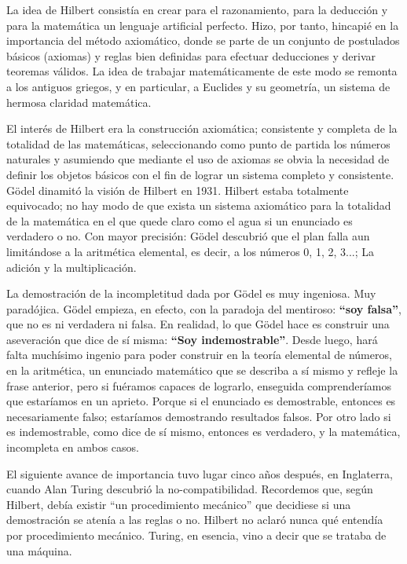 \documentclass{article}
\begin{document}
La idea de Hilbert consistía en crear para el razonamiento, para la deducción y para la matemática un lenguaje artificial perfecto. Hizo, por tanto, hincapié en la importancia del método axiomático, donde se parte de un conjunto de postulados básicos (axiomas) y reglas bien definidas para efectuar deducciones y derivar teoremas válidos. La idea de trabajar matemáticamente de este modo se remonta a los antiguos griegos, y en particular, a Euclides y su geometría, un sistema de hermosa claridad matemática.

El interés de Hilbert era la construcción axiomática; consistente y completa de la totalidad de las matemáticas, seleccionando como punto de partida los números naturales y asumiendo que mediante el uso de axiomas se obvia la necesidad de definir los objetos básicos con el fin de lograr un sistema completo y consistente. 
Gödel dinamitó la visión de Hilbert en 1931. Hilbert estaba totalmente equivocado; no hay modo de que exista un sistema axiomático para la totalidad de la matemática en el que quede claro como el agua si un enunciado es verdadero o no. Con mayor precisión: Gödel descubrió que el plan falla aun limitándose a la aritmética elemental, es decir, a los números 0, 1, 2, 3...; La adición y la multiplicación. 

La demostración de la incompletitud dada por Gödel es muy ingeniosa. Muy paradójica. Gödel empieza, en efecto, con la paradoja del mentiroso: \textbf{“soy falsa”}, que no es ni verdadera ni falsa. En realidad, lo que Gödel hace es construir una aseveración que dice de sí misma: \textbf{“Soy indemostrable”}. Desde luego, hará falta muchísimo ingenio para poder construir en la teoría elemental de números, en la aritmética, un enunciado matemático que se describa a sí mismo y refleje la frase anterior, pero si fuéramos capaces de lograrlo, enseguida comprenderíamos que estaríamos en un aprieto. Porque si el enunciado es demostrable, entonces es necesariamente falso; estaríamos demostrando resultados falsos. Por otro lado si es indemostrable, como dice de sí mismo, entonces es verdadero, y la matemática, incompleta en ambos casos.

El siguiente avance de importancia tuvo lugar cinco años después, en Inglaterra, cuando Alan Turing descubrió la no-compatibilidad. Recordemos que, según Hilbert, debía existir “un procedimiento mecánico” que decidiese si una demostración se atenía a las reglas o no. Hilbert no aclaró nunca qué entendía por procedimiento mecánico. Turing, en esencia, vino a decir que se trataba de una máquina.
\end{document}

